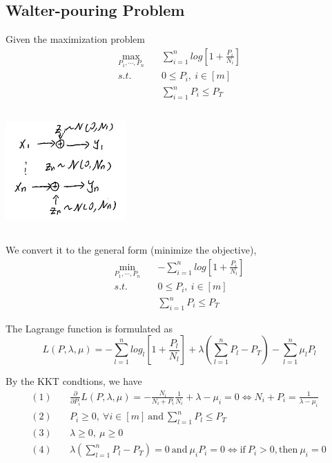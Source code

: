 



\vspace{0.5cm}
\subsection{Walter-pouring Problem}
Given the maximization problem
\begin{align*}
\max_{P_1,\cdots,P_n}\quad &\sum^n_{i=1}log[1+\frac{P_i}{N_i}]\\
s.t. \quad & 0 \leq P_i,\ i\in[m]\\
&\sum^n_{i=1}P_i\leq P_T
\end{align*}

\begin{marginfigure}
	\centering
	\includegraphics[width=1.8in,height=1.8in]{figures/ch10/figure1204_1.png}
\end{marginfigure}
We convert it to the general form (minimize the objective),
\begin{align*}
\min_{P_1,\cdots,P_n}\quad &-\sum^n_{i=1}log[1+\frac{P_i}{N_i}]\\
s.t. \quad & 0 \leq P_i,\ i\in[m]\\
&\sum^n_{i=1}P_i\leq P_T
\end{align*}

The Lagrange function is formulated as
$$L(P, \lambda, \mu) = -\sum^n_{l=1}log_l[1+\frac{P_l}{N_l}] + \lambda(\sum^n_{l=1}P_l-P_T) - \sum^n_{l=1}\mu_lP_l $$

By the KKT condtions, we have
\begin{align*}
(1)\quad &\frac{\partial}{\partial P_i}L(P, \lambda, \mu) = -\frac{N_i}{N_i+P_i}\frac{1}{N_i} + \lambda - \mu_i = 0 \Leftrightarrow N_i+P_i = \frac{1}{\lambda-\mu_i}\\
(2)\quad &P_i \geq 0,\ \forall i\in[m]\ \text{and}\ \sum^n_{l=1}P_l \leq P_T\\
(3)\quad &\lambda\geq 0,\ \mu\geq 0\\
(4)\quad &\lambda(\sum^n_{l=1}P_l - P_T) = 0\ \text{and}\ \mu_iP_i = 0\Leftrightarrow \text{if}\ P_i > 0, \text{then}\ \mu_i =0\ 
\end{align*}

